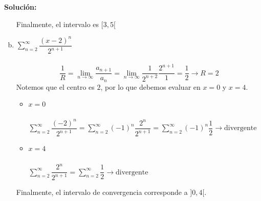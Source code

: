 \documentclass[12pt]{article}
\newenvironment{solucion}
{\begin{mdframed}[backgroundcolor=black!10]
		{\bf Solución:}\\
	}
	{
	\end{mdframed}
}
\newenvironment{preguntas}
{\begin{enumerate}\itemsep12pt
	}
	{
	\end{enumerate}
}
\newcommand{\ra}{\rightarrow}
\begin{document}
\begin{preguntas}
\begin{solucion}
\begin{enumerate}[a)]
\begin{itemize}
\end{itemize}
Finalmente, el intervalo es $[3,5[$
\item $\sum\limits_{n=2}^{\infty}\dfrac{(x-2)^n}{2^{n+1}}$\\
\\
$$\dfrac{1}{R} = \lim\limits_{n \ra \infty} \dfrac{a_{n+1}}{a_n}
= \lim\limits_{n \ra \infty} \dfrac{1}{2^{n+2}}\dfrac{2^{n+1}}{1} = \dfrac{1}{2} \ra R = 2$$
Notemos que el centro es $2$, por lo que debemos evaluar en $x=0$ y $x=4$.
\begin{itemize}
	\item $x=0$\\
	\\
	$\sum\limits_{n=2}^{\infty}\dfrac{(-2)^n}{2^{n+1}} = \sum\limits_{n=2}^{\infty}(-1)^n\dfrac{2^n}{2^{n+1}} = \sum\limits_{n=2}^{\infty}(-1)^n\dfrac{1}{2} \ra \text{divergente}$
	\item $x=4$\\
	\\
	$\sum\limits_{n=2}^{\infty}\dfrac{2^n}{2^{n+1}} = \sum\limits_{n=2}^{\infty}\dfrac{1}{2} \ra \text{divergente}$
\end{itemize}
Finalmente, el intervalo de convergencia corresponde a $]0, 4[$.
\end{enumerate}
\end{solucion}
\end{preguntas}
\end{document}
